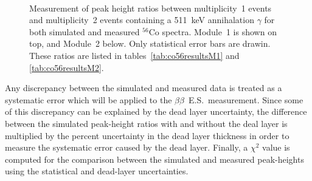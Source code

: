 \documentclass[notitlepage,rmp,aps,10pt]{revtex4-1}
\newcommand{\bb}{${\beta \beta}$}
\newcommand{\bbes}{\bb~E.S.}
\newcommand{\iso}[2]{$^{#1}$#2}
\newcommand{\Co}[1]{\iso{#1}{Co}}
\begin{document}
\begin{figure}[p]
  \centering
  \\
  \caption[Peak height ratio comparison results for module 1 and module 2]{\label{fig:co56results}
    Measurement of peak height ratios between multiplicity~1 events and multiplicity~2 events containing a 511~keV annihalation $\gamma$ for both simulated and measured \Co{56} spectra. Module~1 is shown on top, and Module~2 below. Only statistical error bars are drawin. These ratios are listed in tables~\ref{tab:co56resultsM1} and \ref{tab:co56resultsM2}.
  }
\end{figure}
Any discrepancy between the simulated and measured data is treated as a systematic error which will be applied to the \bbes\ measurement.
Since some of this discrepancy can be explained by the dead layer uncertainty, the difference between the simulated peak-height ratios with and without the deal layer is multiplied by the percent uncertainty in the dead layer thickness in order to measure the systematic error caused by the dead layer.
Finally, a $\chi^2$ value is computed for the comparison between the simulated and measured peak-heights using the statistical and dead-layer uncertainties.
\end{document}
